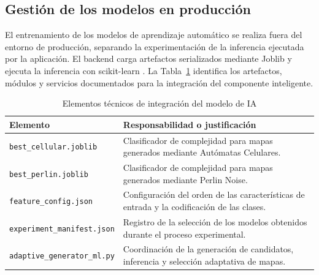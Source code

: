 \subsection{Gestión de los modelos en producción}
\label{subsec:gestion_modelos_produccion}
El entrenamiento de los modelos de aprendizaje automático se realiza fuera del entorno de producción, separando la experimentación de la inferencia ejecutada por la aplicación. El backend carga artefactos serializados mediante Joblib y ejecuta la inferencia con scikit-learn \parencite{pedregosa2011}. La Tabla~\ref{tab:gestion_modelos_ia} identifica los artefactos, módulos y servicios documentados para la integración del componente inteligente.

\begin{table}[htbp]
	\centering
	
	\caption{Elementos técnicos de integración del modelo de IA}
	\label{tab:gestion_modelos_ia}
	
	\renewcommand{\arraystretch}{1.5}
	
	\begin{tabularx}{\textwidth}{
			|>{\raggedright\arraybackslash}p{5.5cm}|
			>{\raggedright\arraybackslash}X|
		}
		\hline
		
		\rowcolor{gray!15}
		\textbf{Elemento} &
		\textbf{Responsabilidad o justificación} \\
		\hline
		
		\texttt{best\_\allowbreak cellular.joblib} &
		Clasificador de complejidad para mapas generados mediante Autómatas Celulares. \\
		\hline
		
		\texttt{best\_\allowbreak perlin.joblib} &
		Clasificador de complejidad para mapas generados mediante Perlin Noise. \\
		\hline
		
		\texttt{feature\_\allowbreak config.json} &
		Configuración del orden de las características de entrada y la codificación de las clases. \\
		\hline
		
		\texttt{experiment\_\allowbreak manifest.json} &
		Registro de la selección de los modelos obtenidos durante el proceso experimental. \\
		\hline
		
		\texttt{adaptive\_\allowbreak generator\_\allowbreak ml.py} &
		Coordinación de la generación de candidatos, inferencia y selección adaptativa de mapas. \\
		\hline
		

\end{tabularx}
\end{table}
